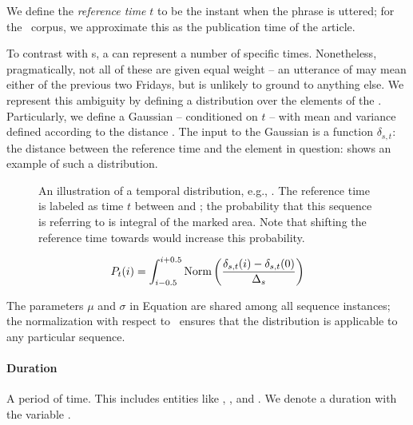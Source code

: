 We define the \textit{reference time} $t$ \cite{key:1947reichenback-temporal}
	to be the instant when the phrase 
	is uttered; for the \tempeval\ corpus, we approximate this as the
	publication time of the article.

To contrast with s, a  can represent a number of specific
	times.
Nonetheless, pragmatically, not all of these are given equal weight --
	an utterance of  may mean either of the previous two Fridays,
	but is unlikely to ground to anything else.
We represent this ambiguity by defining a distribution over the elements
	of the .
Particularly, we define a Gaussian -- conditioned on $t$ -- with mean and
	variance defined according to the distance \seqjump.
The input to the Gaussian is a function $\delta_{s,t}$:
	the distance between the reference time and the element in question:
 shows an example of such a distribution.
\begin{figure}[t]
\begin{center}
	\resizebox{1.1\hsize}{!}{
		
	}
	\caption{
		\label{fig:distribution}
		An illustration of a temporal distribution, e.g., .
		The reference time is labeled as time $t$ between  and 
			; the probability that this sequence is referring to
			 is integral of the marked area.
		Note that shifting the reference time towards  would increase
			this probability.
	}
\end{center}
\end{figure}
\begin{equation}
\label{eqn:gaussian}
	P_t(i) = 
	\int_{i-0.5}^{i+0.5}
		\textrm{Norm}\left(\frac{\delta_{s,t}(i)-\delta_{s,t}(0)}{\Delta_s}\right)
\end{equation}

The parameters $\mu$ and $\sigma$ in Equation  are shared
	among all sequence instances; the normalization
	with respect to \seqjump\ ensures that the distribution is applicable
	to any particular sequence.
	
\paragraph{Duration}
A period of time.
This includes entities like , , and .
We denote a duration with the variable \dur.

